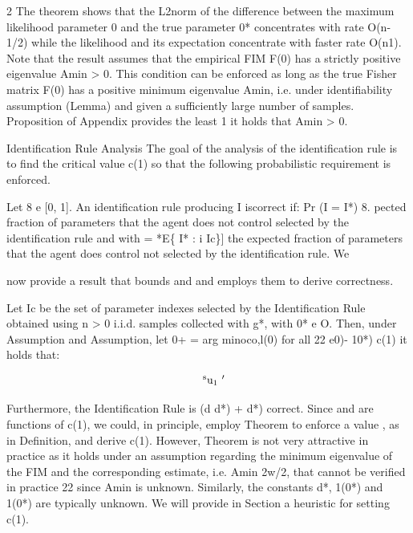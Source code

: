 \documentclass{article}
\begin{document}
\begin{paracol}{2}
The theorem shows that the L2norm of the difference between the maximum likelihood parameter 0 and the true parameter 0* concentrates with rate O(n-1/2) while the likelihood  and its expectation  concentrate with faster rate
O(n1). Note that the result assumes that the empirical FIM
F(0) has a strictly positive eigenvalue Amin > 0. This condition can be enforced as long as the true Fisher matrix F(0)
has a positive minimum eigenvalue Amin, i.e. under identifiability assumption (Lemma) and given a sufficiently large
number of samples. Proposition of Appendix provides the
least 1   it holds that Amin > 0.


Identification Rule Analysis The goal of the analysis of
the identification rule is to find the critical value c(1) so that
the following probabilistic requirement is enforced.


Let 8 e [0, 1]. An identification rule producing I iscorrect if: Pr (I = I*)  8.
pected fraction of parameters that the agent does not control
selected by the identification rule and with  = *E\{ 
I* : i  Ic\}] the expected fraction of parameters that the
agent does control not selected by the identification rule. We

\switchcolumn
\RaggedRight

now provide a result that bounds  and  and employs them
to derive correctness.


Let Ic be the set of parameter indexes selected by the
Identification Rule obtained using n > 0 i.i.d. samples
collected with g*, with 0* e O. Then, under Assumption and Assumption, let 0+ = arg minoco,l(0) for all
22
e0)- 10*)  c(1) it holds that:


\begin{equation}
\begin{array} { r l } & { \mathrm { ~ ^ { s } u _ { 1 } ~'~ }}\end{array}
\end{equation}


Furthermore, the Identification Rule is (d  d*) + d*)
correct.
Since  and  are functions of c(1), we could, in principle, employ Theorem to enforce a value , as in Definition, and derive c(1). However, Theorem is not very attractive in practice as it holds under an assumption regarding the
minimum eigenvalue of the FIM and the corresponding estimate, i.e. Amin 2w/2, that cannot be verified in practice
22
since Amin is unknown. Similarly, the constants d*, 1(0*)
and 1(0*) are typically unknown. We will provide in Section
a heuristic for setting c(1).



\end{paracol}
\end{document}
